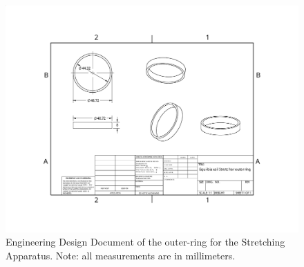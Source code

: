 \begin{figure}[h!]
	
	
	\centerline{\includegraphics[scale=.85]{Chapters/Figures/Stretcher_outer.pdf}}
	\vspace{-.7em}
	\caption[Stretcher outer-ring]{Engineering Design Document of the outer-ring for the Stretching Apparatus. Note: all measurements are in millimeters.}
	
	\label{fig:stretcherDesignRing}
\end{figure}


